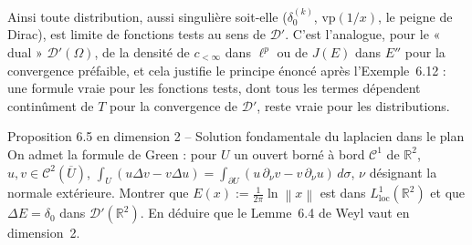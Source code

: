 \documentclass[11pt,a4paper]{article}
\newcommand{\R}{\mathbb{R}}
\newcommand{\adh}[1]{\overline{#1}}
\newcommand{\norm}[1]{\left\|#1\right\|}
\newcommand{\D}{\mathcal{D}}
\theoremstyle{definition}
\begin{document}
\begin{commentaire}
Ainsi toute distribution, aussi singulière soit-elle ($\delta_0^{(k)}$, $\mathrm{vp}(1/x)$, le peigne de Dirac), est limite de fonctions tests au sens de $\D'$. C'est l'analogue, pour le « dual » $\D'(\Omega)$, de la densité de $c_{<\infty}$ dans $\ell^p$ ou de $J(E)$ dans $E''$ pour la convergence préfaible, et cela justifie le principe énoncé après l'Exemple~6.12 : une formule vraie pour les fonctions tests, dont tous les termes dépendent continûment de $T$ pour la convergence de $\D'$, reste vraie pour les distributions.
\end{commentaire}

\begin{exo}{Proposition 6.5 en dimension 2 -- Solution fondamentale du laplacien dans le plan}
On admet la formule de Green : pour $U$ un ouvert borné à bord $\mathcal C^1$ de $\R^2$, $u,v\in\mathcal C^2(\adh U)$, $\int_U(u\Delta v-v\Delta u)=\int_{\partial U}(u\,\partial_\nu v-v\,\partial_\nu u)\,d\sigma$, $\nu$ désignant la normale extérieure. Montrer que $E(x):=\frac1{2\pi}\ln\norm x$ est dans $L^1_{\mathrm{loc}}(\R^2)$ et que $\Delta E=\delta_0$ dans $\D'(\R^2)$. En déduire que le Lemme~6.4 de Weyl vaut en dimension~2.
\end{exo}
\end{document}

